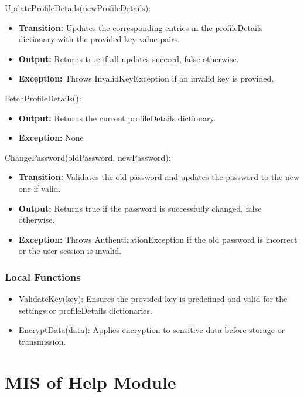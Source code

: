 \documentclass[12pt, titlepage]{article}
\begin{document}
\noindent UpdateProfileDetails(newProfileDetails):
\begin{itemize}
  \item \textbf{Transition:} Updates the corresponding entries in the profileDetails dictionary with the provided key-value pairs.
  \item \textbf{Output:} Returns true if all updates succeed, false otherwise.
  \item \textbf{Exception:} Throws InvalidKeyException if an invalid key is provided.
\end{itemize}

\noindent FetchProfileDetails():
\begin{itemize}
  \item \textbf{Output:} Returns the current profileDetails dictionary.
  \item \textbf{Exception:} None
\end{itemize}

\noindent ChangePassword(oldPassword, newPassword):
\begin{itemize}
  \item \textbf{Transition:} Validates the old password and updates the password to the new one if valid.
  \item \textbf{Output:} Returns true if the password is successfully changed, false otherwise.
  \item \textbf{Exception:} Throws AuthenticationException if the old password is incorrect or the user session is invalid.
\end{itemize}

\subsubsection{Local Functions}

\begin{itemize}
  \item ValidateKey(key): Ensures the provided key is predefined and valid for the settings or profileDetails dictionaries.
  \item EncryptData(data): Applies encryption to sensitive data before storage or transmission.
\end{itemize}


\newpage

\section{MIS of Help Module} \label{Module_Help}
\end{document}
